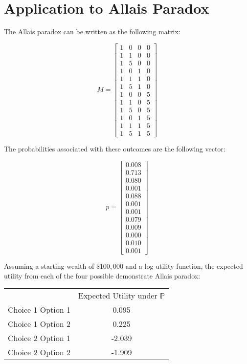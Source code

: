 \documentclass{article}
\begin{document}
\section{Application to Allais Paradox}

The Allais paradox can be written as the following matrix:

\[M=\begin{bmatrix}
1 & 0 & 0 & 0 \\
1 & 1 & 0 & 0 \\
1 & 5 & 0 & 0 \\
1 & 0 & 1 & 0 \\
1 & 1 & 1 & 0 \\
1 & 5 & 1 & 0 \\
1 & 0 & 0 & 5 \\
1 & 1 & 0 & 5 \\
1 & 5 & 0 & 5 \\
1 & 0 & 1 & 5 \\
1 & 1 & 1 & 5 \\
1 & 5 & 1 & 5
\end{bmatrix}\]

The probabilities associated with these outcomes are the following vector:

\[p=\begin{bmatrix}
0.008 \\
0.713 \\
0.080 \\
0.001 \\
0.088 \\
0.001 \\
0.001 \\
0.079 \\
0.009 \\
0.000 \\
0.010 \\
0.001
\end{bmatrix}\]

Assuming a starting wealth of \(\$100,000\) and a log utility function, the expected utility from each of the four possible demonstrate Allais paradox:


\begin{center} 
	\begin{tabular}{c c}
		& Expected Utility under \(\mathbb{P}\) \\
		Choice 1 Option 1 & 0.095 \\
		Choice 1 Option 2 & 0.225 \\
		Choice 2 Option 1 & -2.039 \\
		Choice 2 Option 2 & -1.909 \\

	\end{tabular}
\end{center}
\end{document}
